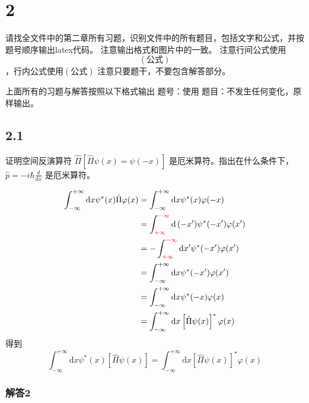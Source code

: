 \section{2}
请找全文件中的第二章所有习题，识别文件中的所有题目，包括文字和公式，并按题号顺序输出latex代码。
注意输出格式和图片中的一致。
注意行间公式使用$$(公式)$$，行内公式使用$(公式)$
注意只要题干，不要包含解答部分。

上面所有的习题与解答按照以下格式输出
题号：使用%
题目：不发生任何变化，原样输出。

\subsection{2.1}
证明空间反演算符 $\hat{\Pi}[\hat{\Pi}\psi(x)=\psi(-x)]$ 是厄米算符。指出在什么条件下，$\hat{p}=-i\hbar\frac{d}{dx}$ 是厄米算符。

\begin{equation}
    \begin{aligned}
        \int_{-\infty}^{+\infty}{\mathrm{d}x}\psi ^*(x)\hat{\Pi}\varphi (x)&=\int_{-\infty}^{+\infty}{\mathrm{d}x}\psi ^*(x)\varphi (-x)
\\
&=\int_{{\color[RGB]{240, 0, 0} +\infty }}^{{\color[RGB]{240, 0, 0} -\infty }}{\mathrm{d}\left( -x^{\prime} \right)}\psi ^*(-x^{\prime})\varphi (x^{\prime})
\\
&=-\int_{{\color[RGB]{240, 0, 0} +\infty }}^{{\color[RGB]{240, 0, 0} -\infty }}{\mathrm{d}x^{\prime}}\psi ^*(-x^{\prime})\varphi (x^{\prime})
\\
&=\int_{-\infty}^{+\infty}{\mathrm{d}x}\psi ^*(-x^{\prime})\varphi (x^{\prime})
\\
&=\int_{-\infty}^{+\infty}{\mathrm{d}x}\psi ^*(-x)\varphi (x)
\\
&=\int_{-\infty}^{+\infty}{\mathrm{d}x}\left[ \hat{\Pi}\psi (x) \right] ^*\varphi (x)
    \end{aligned}
\end{equation}
得到
\begin{equation}
    \int_{-\infty}^{+\infty}{\mathrm{d}x}\psi ^*(x)\left[ \hat{\Pi}\psi (x) \right] =\int_{-\infty}^{+\infty}{\mathrm{d}x}\left[ \hat{\Pi}\psi (x) \right] ^*\varphi (x)
\end{equation}

\subsubsection{解答2}


